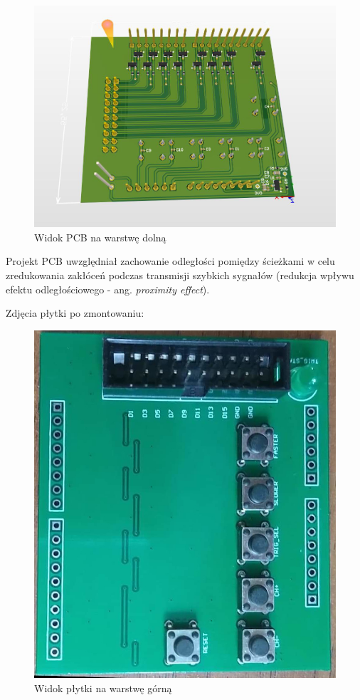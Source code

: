\begin{figure}[H]
\begin{center}
\includegraphics[width=4 in]{images/3D_2.png}
\end{center}
\caption{Widok PCB na warstwę dolną}
\label{fig:PCB_3D_bottom}
\end{figure}

Projekt PCB uwzględniał zachowanie odległości pomiędzy ścieżkami w celu zredukowania zakłóceń podczas transmisji szybkich sygnałów (redukcja wpływu efektu odległościowego - ang. \emph{proximity effect}).

Zdjęcia płytki po zmontowaniu:

\begin{figure}[H]
\begin{center}
\includegraphics[width=4 in]{images/PCB_front.jpeg}
\end{center}
\caption{Widok płytki na warstwę górną}
\label{fig:PCB_top}
\end{figure}

